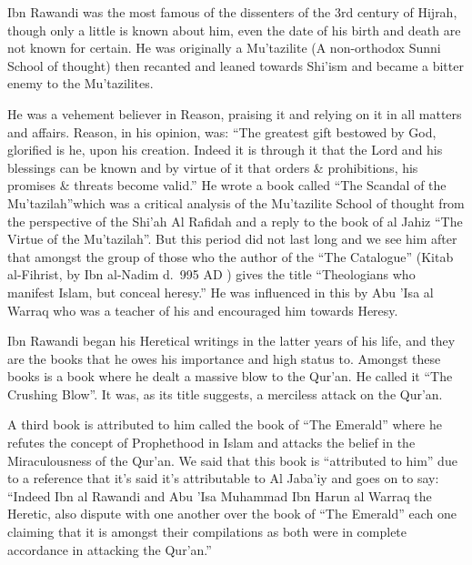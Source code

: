 \documentclass[12pt]{book}
\begin{document}
Ibn Rawandi was the most famous of the dissenters of the 3rd century of Hijrah,
though only a little is known about him, even the date of his birth and death
are not known for certain. He was originally a Mu’tazilite (A non-orthodox
Sunni School of thought) then recanted and leaned towards Shi’ism and became
a bitter enemy to the Mu’tazilites.

He was a vehement believer in Reason, praising it and relying on it in all
matters and affairs. Reason, in his opinion, was: “The greatest gift bestowed
by God, glorified is he, upon his creation. Indeed it is through it that the
Lord and his blessings can be known and by virtue of it that orders \&
prohibitions, his promises \& threats become valid.”\footnotemark
He wrote a book called “The Scandal of the Mu’tazilah”\footnotemark which was a
critical analysis of the Mu’tazilite School of thought from the perspective of
the Shi’ah Al Rafidah and a reply to the book of al Jahiz “The Virtue of the
Mu’tazilah”. But this period did not last long and we see him after that
amongst the group of those who the author of the “The Catalogue” (Kitab
al-Fihrist, by Ibn al-Nadim d.\ 995 AD ) gives the title “Theologians who
manifest Islam, but conceal heresy.” He was influenced in this by Abu ’Isa al
Warraq who was a teacher of his and encouraged him towards Heresy.


Ibn Rawandi began his Heretical writings in the latter years of his life, and
they are the books that he owes his importance and high status to. Amongst
these books is a book where he dealt a massive blow to the Qur’an. He called it
“The Crushing Blow”. It was, as its title suggests, a merciless attack on the
Qur’an.

A third book is attributed to him called the book of “The Emerald” where he
refutes the concept of Prophethood in Islam and attacks the belief in the
Miraculousness of the Qur’an. We said that this book is “attributed to him” due
to a reference that it’s said it’s attributable to Al Jaba’iy and goes on to
say: “Indeed Ibn al Rawandi and Abu ’Isa Muhammad Ibn Harun al Warraq the
Heretic, also dispute with one another over the book of “The Emerald” each one
claiming that it is amongst their compilations as both were in complete
accordance in attacking the Qur’an.”\footnotemark
\end{document}
